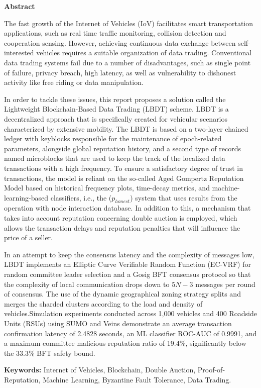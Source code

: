 \documentclass[12pt,phd,times]{pkmthesis}
\begin{document}
\thispagestyle{empty}
%
{\renewcommand{\baselinestretch}{1.5}
{%
\begin{center}
	{\bf{Abstract}}
\end{center}
{\em{\noindent The fast growth of the Internet of Vehicles (IoV) facilitates smart transportation applications, such as real time traffic monitoring, collision detection and cooperation sensing. However, achieving continuous data exchange between self-interested vehicles requires a suitable organization of data trading. Conventional data trading systems fail due to a number of disadvantages, such as single point of failure, privacy breach, high latency, as well as vulnerability to dishonest activity like free riding or data manipulation. 

In order to tackle these issues, this report proposes a solution called the Lightweight Blockchain-Based Data Trading (LBDT) scheme. LBDT is a decentralized approach that is specifically created for vehicular scenarios characterized by extensive mobility. The LBDT is based on a two-layer chained ledger with keyblocks responsible for the maintenance of epoch-related parameters, alongside global reputation history, and a second type of records named microblocks that are used to keep the track of the localized data transactions with a high frequency. To ensure a satisfactory degree of trust in transactions, the model is reliant on the so-called Aged Gompertz Reputation Model based on historical frequency plots, time-decay metrics, and machine-learning-based classifiers, i.e., the ($p_{honest}$) system that uses results from the operation with node interaction database. In addition to this, a mechanism that takes into account reputation concerning double auction is employed, which allows the transaction delays and reputation penalties that will influence the price of a seller.

In an attempt to keep the consensus latency and the complexity of messages low, LBDT implements an Elliptic Curve Verifiable Random Function (EC-VRF) for random committee leader selection and a Gosig BFT consensus protocol so that the complexity of local communication drops down to $5N-3$ messages per round of consensus. The use of the dynamic geographical zoning strategy splits and merges the sharded clusters according to the load and density of vehicles.Simulation experiments conducted across 1,000 vehicles and 400 Roadside Units (RSUs) using SUMO and Veins demonstrate an average transaction confirmation latency of 2.4828 seconds, an ML classifier ROC-AUC of 0.9991, and a maximum committee malicious reputation ratio of 19.4\%, significantly below the 33.3\% BFT safety bound.

\par\vspace{1em}
\textbf{Keywords:} Internet of Vehicles, Blockchain, Double Auction, Proof-of-Reputation, Machine Learning, Byzantine Fault Tolerance, Data Trading.

	}}}}	
\end{document}
